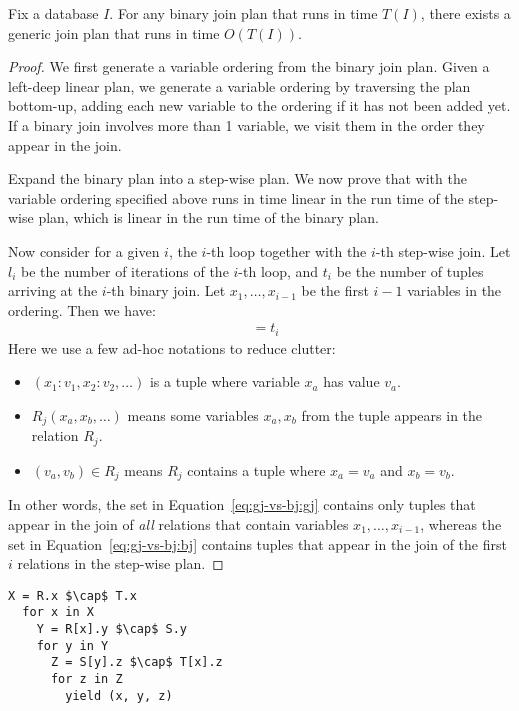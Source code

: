 \begin{theorem}
  Fix a database $I$. 
  For any binary join plan that runs in time $T(I)$,
   there exists a generic join plan that runs in time $O(T(I))$.
\end{theorem}
\begin{proof}
  We first generate a variable ordering from the binary join plan.
  Given a left-deep linear plan, 
    we generate a variable ordering by traversing the plan bottom-up,
    adding each new variable to the ordering if it has not been added yet.
  If a binary join involves more than 1 variable,
    we visit them in the order they appear in the join.

  Expand the binary plan into a step-wise plan.
  We now prove that \GJ with the variable ordering
    specified above runs in time linear in the run time of the step-wise plan,
    which is linear in the run time of the binary plan.

  Now consider for a given $i$, 
    the $i$-th \GJ loop together with the $i$-th step-wise join.
  Let $l_i$ be the number of iterations of the $i$-th \GJ loop,
    and $t_i$ be the number of tuples arriving at the $i$-th binary join.
  Let $x_1, \ldots, x_{i-1}$ be the first $i-1$ variables in the ordering.
  Then we have: 
%
\begin{align}
    & = t_i
\end{align}
%
  Here we use a few ad-hoc notations to reduce clutter:
  \begin{itemize}
    \item $(x_1 : v_1, x_2 : v_2, \ldots)$ is a tuple where variable $x_a$ has value $v_a$.
    \item $R_j(x_a, x_b, \ldots)$ means some variables $x_a, x_b$ from the tuple appears in the relation $R_j$.
    \item $(v_a, v_b) \in R_j$ means $R_j$ contains a tuple where $x_a = v_a$ and $x_b = v_b$.
  \end{itemize}
  In other words, the set in Equation~\ref{eq:gj-vs-bj:gj} contains only tuples that appear in the join of \emph{all}
    relations that contain variables $x_1, \ldots, x_{i-1}$,
    whereas the set in Equation~\ref{eq:gj-vs-bj:bj} contains tuples that appear in the join of the first $i$ relations
    in the step-wise plan.
\end{proof}

\begin{lstlisting}[mathescape=true]
  X = R.x $\cap$ T.x
  for x in X
    Y = R[x].y $\cap$ S.y
    for y in Y
      Z = S[y].z $\cap$ T[x].z
      for z in Z
        yield (x, y, z)
\end{lstlisting}



